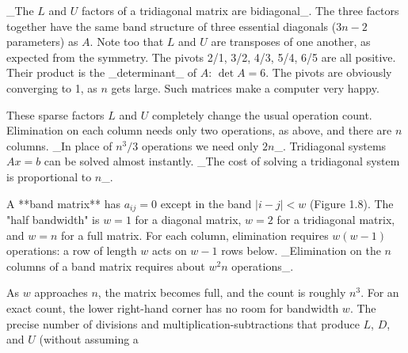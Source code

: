 _The \(L\) and \(U\) factors of a tridiagonal matrix are bidiagonal_. The three factors together have the same band structure of three essential diagonals (\(3n-2\) parameters) as \(A\). Note too that \(L\) and \(U\) are transposes of one another, as expected from the symmetry. The pivots 2/1, 3/2, 4/3, 5/4, 6/5 are all positive. Their product is the _determinant_ of \(A\): \(\det A=6\). The pivots are obviously converging to 1, as \(n\) gets large. Such matrices make a computer very happy.

These sparse factors \(L\) and \(U\) completely change the usual operation count. Elimination on each column needs only two operations, as above, and there are \(n\) columns. _In place of \(n^{3}/3\) operations we need only \(2n\)_. Tridiagonal systems \(Ax=b\) can be solved almost instantly. _The cost of solving a tridiagonal system is proportional to \(n\)_.

A **band matrix** has \(a_{ij}=0\) except in the band \(|i-j|<w\) (Figure 1.8). The "half bandwidth" is \(w=1\) for a diagonal matrix, \(w=2\) for a tridiagonal matrix, and \(w=n\) for a full matrix. For each column, elimination requires \(w(w-1)\) operations: a row of length \(w\) acts on \(w-1\) rows below. _Elimination on the \(n\) columns of a band matrix requires about \(w^{2}n\) operations_.

As \(w\) approaches \(n\), the matrix becomes full, and the count is roughly \(n^{3}\). For an exact count, the lower right-hand corner has no room for bandwidth \(w\). The precise number of divisions and multiplication-subtractions that produce \(L\), \(D\), and \(U\) (without assuming a 